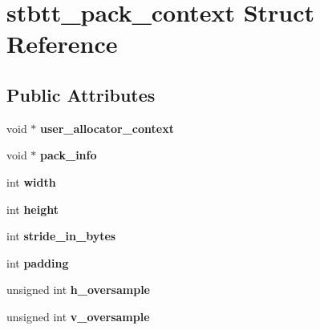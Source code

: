 \hypertarget{structstbtt__pack__context}{}\section{stbtt\+\_\+pack\+\_\+context Struct Reference}
\label{structstbtt__pack__context}
\subsection*{Public Attributes}
\begin{DoxyCompactItemize}
\item 
void $\ast$ {\bfseries user\+\_\+allocator\+\_\+context}\hypertarget{structstbtt__pack__context_a45fddc4d4adfcef58aa08ad2874cedc0}{}\label{structstbtt__pack__context_a45fddc4d4adfcef58aa08ad2874cedc0}

\item 
void $\ast$ {\bfseries pack\+\_\+info}\hypertarget{structstbtt__pack__context_a303a72f0a39479b439fa531925be7031}{}\label{structstbtt__pack__context_a303a72f0a39479b439fa531925be7031}

\item 
int {\bfseries width}\hypertarget{structstbtt__pack__context_a5da0b7b5d3b82d5fc75ea1c8945183fa}{}\label{structstbtt__pack__context_a5da0b7b5d3b82d5fc75ea1c8945183fa}

\item 
int {\bfseries height}\hypertarget{structstbtt__pack__context_a817ec010d7f09ba9776517c5a87f13a7}{}\label{structstbtt__pack__context_a817ec010d7f09ba9776517c5a87f13a7}

\item 
int {\bfseries stride\+\_\+in\+\_\+bytes}\hypertarget{structstbtt__pack__context_abbe9a25aae0e26b81a5f7339fac23801}{}\label{structstbtt__pack__context_abbe9a25aae0e26b81a5f7339fac23801}

\item 
int {\bfseries padding}\hypertarget{structstbtt__pack__context_a1191f34fa995910044191584f0d7a803}{}\label{structstbtt__pack__context_a1191f34fa995910044191584f0d7a803}

\item 
unsigned int {\bfseries h\+\_\+oversample}\hypertarget{structstbtt__pack__context_aee1019f9634cad49fa07e8e1f897d6b7}{}\label{structstbtt__pack__context_aee1019f9634cad49fa07e8e1f897d6b7}

\item 
unsigned int {\bfseries v\+\_\+oversample}\hypertarget{structstbtt__pack__context_a4b55efa27ef36e7f258afe92921784c0}{}\label{structstbtt__pack__context_a4b55efa27ef36e7f258afe92921784c0}


\end{DoxyCompactItemize}
